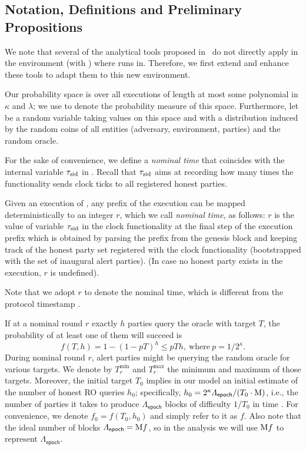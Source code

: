 \subsection{Notation, Definitions and Preliminary Propositions}
\label{subsec:analysis-preliminaries}

We note that several of the analytical tools proposed in~\cite{C:GarKiaLeo17,EPRINT:GarKiaLeo20} do not directly apply in the environment (with \funcImpClock) where \timekeeper runs in.
%
Therefore, we first extend and enhance these tools to adapt them to this new environment.

Our probability space is over all executions of length at most some polynomial in $\kappa$ and $\lambda$; we use \Pr to denote the probability measure of this space.
%
Furthermore, let \E be a random variable taking values on this space and with a distribution induced by the random coins of all entities (adversary, environment, parties) and the random oracle.

For the sake of convenience, we define a \emph{nominal time} that coincides with the internal variable $\tau_\mathrm{sid}$ in \funcImpClock.
%
Recall that $\tau_\mathrm{sid}$ aims at recording how many times the functionality sends clock ticks to all registered honest parties.

\begin{definition}
    \label{def:nominal-time}

    Given an execution of \timekeeper, any prefix of the execution can be mapped deterministically to an integer $r$, which we call \emph{nominal time}, as follows:
    $r$ is the value of variable $\tau_\mathrm{sid}$ in the clock functionality at the final step of the execution prefix which is obtained by parsing the prefix from the genesis block and keeping track of the honest party set registered with the clock functionality (bootstrapped with the set of inaugural alert parties).
    (In case no honest party exists in the execution, $r$ is undefined).
\end{definition}

Note that we adopt $r$ to denote the nominal time, which is different from the protocol timestamp \protocolTime{\interval}{\round}.

If at a nominal round $r$ exactly $h$ parties query the oracle with target $T$, the probability of at least one of them will succeed is
%
\[ f(T, h) = 1 - (1 - p T)^h \le p T h, ~\text{where}~ p = 1 / 2^\kappa. \]
%
During nominal round $r$, alert parties might be querying the random oracle for various targets.
%
We denote by $T_r^{\min}$ and $T_r^{\max}$ the minimum and maximum of those targets.
%
Moreover, the initial target $T_0$ implies in our model an initial estimate of the number of honest RO queries $h_0$; specifically, $h_0 = 2^\kappa \varLambda_{\mathsf{epoch}} / (T_0 \cdot \mathrm{M})$, i.e., the number of parties it takes to produce $\varLambda_{\mathsf{epoch}}$ blocks of difficulty $1 / T_0$ in time \diffLen.
%
For convenience, we denote $f_0 = f(T_0, h_0)$ and simply refer to it as $f$.
%
Also note that the ideal number of blocks $\varLambda_{\mathsf{epoch}} = \mathrm{M} f$, so in the analysis we will use $\mathrm{M} f$ to represent $\varLambda_{\mathsf{epoch}}$.

